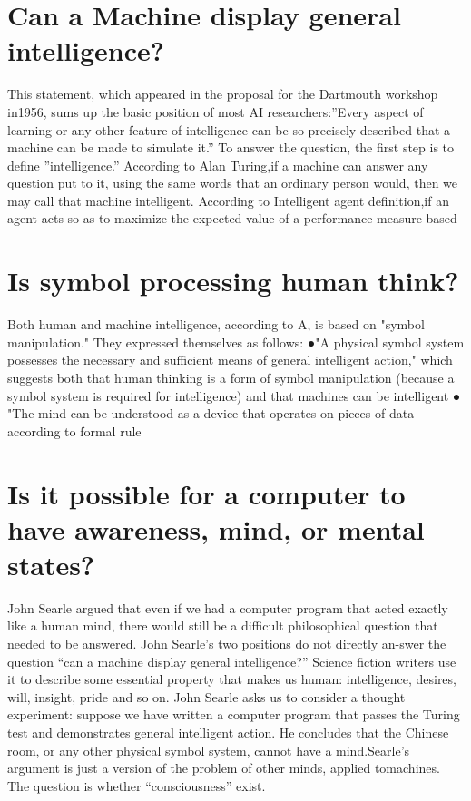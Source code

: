 \documentclass[a4paper,10pt]{article}
\begin{document}
\section{ Can a Machine display general intelligence?}
This statement, which appeared in the proposal for the Dartmouth workshop in1956, sums up the basic position of most AI researchers:”Every aspect of learning or any other feature of intelligence can be so precisely described that a machine can be made to simulate it.” To answer the question, the first step is to define ”intelligence.” According to Alan Turing,if a machine can answer any question put to it, using the same words that an ordinary person would, then we may call that machine intelligent. According to Intelligent agent definition,if an agent acts so as to maximize the expected value of a performance measure based 
\section{Is symbol processing human think?}
Both human and machine intelligence, according to A, is based on "symbol
manipulation." They expressed themselves as follows:
●"A physical symbol system possesses the necessary and sufficient means of general intelligent action," which suggests both that human thinking is a form of symbol
manipulation (because a symbol system is required for intelligence) and that machines can be intelligent
● "The mind can be understood as a device that operates on pieces of data according to formal rule

\section {Is it possible for a computer to have awareness, mind, or mental states?}
John Searle argued that even if we had a computer program that acted exactly like a human mind, there would still be a difficult philosophical question that needed to be answered. John Searle’s two positions do not directly an-swer the question “can a machine display general intelligence?” Science fiction writers use it to describe some essential property that makes us human: intelligence, desires, will, insight, pride and so on. John Searle asks us to consider a
thought experiment: suppose we have written a computer program that passes the Turing test and demonstrates general intelligent action. He concludes that the Chinese room, or any other physical symbol system, cannot have a mind.Searle’s argument is just a version of the problem of other minds, applied
tomachines. The question is whether “consciousness” exist.
\end{document}
